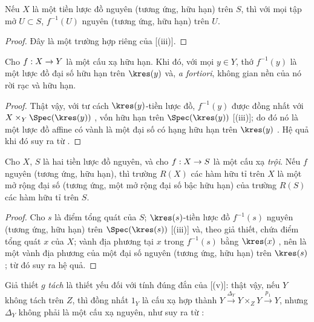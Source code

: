 \documentclass[oneside,10pt]{amsart}
\makeatletter
\newcommand{\ega@arrow}[2]{\mathchoice{#1}{#2}{#2}{#2}}
\renewcommand{\to}{\ega@arrow{\longrightarrow}{\rightarrow}}
\let\EGAOriginalLabel\label
\renewcommand{\label}[1]{\phantomsection\EGAOriginalLabel{#1}}
\makeatother
\begin{document}
\begin{corollary}[6.1.6]
\label{II.6.1.6}
Nếu $X$ là một tiền lược đồ nguyên (tương ứng, hữu hạn) trên $S$, thì với mọi tập mở $U\subset S$, $f^{-1}(U)$ nguyên (tương ứng, hữu hạn) trên $U$.
\end{corollary}

\begin{proof}
Đây là một trường hợp riêng của [(iii)].
\end{proof}

\begin{corollary}[6.1.7]
\label{II.6.1.7}
Cho $f:X\to Y$ là một cấu xạ hữu hạn.
Khi đó, với mọi $y\in Y$, thớ $f^{-1}(y)$ là một lược đồ đại số hữu hạn trên $\kres(y)$ và, \emph{a fortiori}, không gian nền của nó rời rạc và hữu hạn.
\end{corollary}

\begin{proof}
Thật vậy, với tư cách $\kres(y)$-tiền lược đồ, $f^{-1}(y)$ được đồng nhất với $X\times_Y\Spec(\kres(y))$ , vốn hữu hạn trên $\Spec(\kres(y))$ [(iii)];
do đó nó là một lược đồ affine có vành là một đại số có hạng hữu hạn trên $\kres(y)$ .
Hệ quả khi đó suy ra từ .
\end{proof}

\begin{corollary}[6.1.8]
\label{II.6.1.8}
Cho $X$, $S$ là hai tiền lược đồ nguyên, và cho $f:X\to S$ là một cấu xạ \emph{trội}.
Nếu $f$ nguyên (tương ứng, hữu hạn), thì trường $R(X)$ các hàm hữu tỉ trên $X$ là một mở rộng đại số (tương ứng, một mở rộng đại số bậc hữu hạn) của trường $R(S)$ các hàm hữu tỉ trên $S$.
\end{corollary}

\begin{proof}
Cho $s$ là điểm tổng quát của $S$;
$\kres(s)$-tiền lược đồ $f^{-1}(s)$ nguyên (tương ứng, hữu hạn) trên $\Spec(\kres(s))$ [(iii)] và, theo giả thiết, chứa điểm tổng quát $x$ của $X$;
vành địa phương tại $x$ trong $f^{-1}(s)$ bằng $\kres(x)$ , nên là một vành địa phương của một đại số nguyên (tương ứng, hữu hạn) trên $\kres(s)$ ; từ đó suy ra hệ quả.
\end{proof}

\begin{remark}[6.1.9]
\label{II.6.1.9}
Giả thiết $g$ \emph{tách} là thiết yếu đối với tính đúng đắn của [(v)]: thật vậy, nếu $Y$ không tách trên $Z$, thì đồng nhất $1_Y$ là cấu xạ hợp thành $Y\xrightarrow{\Delta_Y}Y\times_Z Y\xrightarrow{p_1}Y$, nhưng $\Delta_Y$ không phải là một cấu xạ nguyên, như suy ra từ :
\end{remark}
\end{document}
